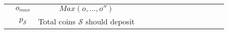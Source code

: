 \begin{table*}[!htbp]
\begin{scriptsize}
\begin{center}
{{\begin{tabular}{|c|c|c|c|c|c|c|c|c|c|c|c|c|c|}
         &\cellcolor{gray!20}\scriptsize$o_{\scriptscriptstyle max}$ &\cellcolor{gray!20}\scriptsize   $Max(o,...,o'')$\\  
                     
&\cellcolor{white!20}\scriptsize$p_{\scriptscriptstyle\mathcal{S}}$ &\cellcolor{white!20}\scriptsize  Total coins $\mathcal{S}$ should deposit\\ 
                
           
         \hline  
           
           
           
\end{tabular}\label{table:notation-table}

}}
\end{center}
\end{scriptsize}
\end{table*}





























